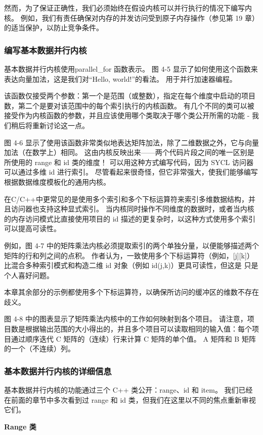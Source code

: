 然而，为了保证正确性，我们必须始终在假设内核可以并行执行的情况下编写内核。 例如，我们有责任确保对内存的并发访问受到原子内存操作（参见第 19 章）的适当保护，以防止竞争条件。

\subsubsection{编写基本数据并行内核}
基本数据并行内核使用parallel\_for 函数表示。 图 4-5 显示了如何使用这个函数来表达向量加法，这是我们对“Hello, world!”的看法。 用于并行加速器编程。

该函数仅接受两个参数：第一个是范围（或整数），指定在每个维度中启动的项目数，第二个是要对该范围中的每个索引执行的内核函数。 有几个不同的类可以被接受作为内核函数的参数，并且应该使用哪个类取决于哪个类公开所需的功能 - 我们稍后将重新讨论这一点。

图 4-6 显示了使用该函数非常类似地表达矩阵加法，除了二维数据之外，它与向量加法（在数学上）相同。 这由内核反映出来——两个代码片段之间的唯一区别是所使用的 range 和 id 类的维度！ 可以用这种方式编写代码，因为 SYCL 访问器可以通过多维 id 进行索引。 尽管看起来很奇怪，但它非常强大，使我们能够编写根据数据维度模板化的通用内核。

在C/C++中更常见的是使用多个索引和多个下标运算符来索引多维数据结构，并且访问器也支持这种显式索引。 当内核同时操作不同维度的数据时，或者当内核的内存访问模式比直接使用项目的 id 描述的更复杂时，以这种方式使用多个索引可以提高可读性。

例如，图 4-7 中的矩阵乘法内核必须提取索引的两个单独分量，以便能够描述两个矩阵的行和列之间的点积。 作者认为，一致使用多个下标运算符（例如，[j][k]）比混合多种索引模式和构造二维 id 对象（例如 id(j,k)）更具可读性，但这是 只是个人喜好问题。

本章其余部分的示例都使用多个下标运算符，以确保所访问的缓冲区的维数不存在歧义。

图 4-8 中的图表显示了矩阵乘法内核中的工作如何映射到各个项目。 请注意，项目数是根据输出范围的大小得出的，并且多个项目可以读取相同的输入值：每个项目通过顺序迭代 C 矩阵的（连续）行来计算 C 矩阵的单个值。 A 矩阵和 B 矩阵的一个（不连续）列。

\subsubsection{基本数据并行内核的详细信息}
基本数据并行内核的功能通过三个 C++ 类公开：range、id 和 item。 我们已经在前面的章节中多次看到过 range 和 id 类，但我们在这里以不同的焦点重新审视它们。

\textbf{Range 类}

